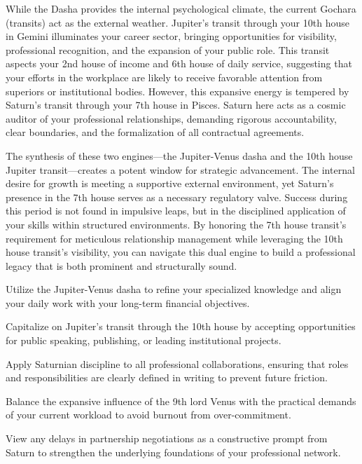 {\fontsize{9}{13}\selectfont While the Dasha provides the internal psychological climate, the current Gochara (transits) act as the external weather. Jupiter's transit through your 10th house in Gemini illuminates your career sector, bringing opportunities for visibility, professional recognition, and the expansion of your public role. This transit aspects your 2nd house of income and 6th house of daily service, suggesting that your efforts in the workplace are likely to receive favorable attention from superiors or institutional bodies. However, this expansive energy is tempered by Saturn's transit through your 7th house in Pisces. Saturn here acts as a cosmic auditor of your professional relationships, demanding rigorous accountability, clear boundaries, and the formalization of all contractual agreements.}\par\vspace{1.8mm}

{\fontsize{9}{13}\selectfont The synthesis of these two engines---the Jupiter-Venus dasha and the 10th house Jupiter transit---creates a potent window for strategic advancement. The internal desire for growth is meeting a supportive external environment, yet Saturn's presence in the 7th house serves as a necessary regulatory valve. Success during this period is not found in impulsive leaps, but in the disciplined application of your skills within structured environments. By honoring the 7th house transit's requirement for meticulous relationship management while leveraging the 10th house transit's visibility, you can navigate this dual engine to build a professional legacy that is both prominent and structurally sound.}\par\vspace{1.8mm}

\begin{diamondlist}
  \item {\fontsize{8.5}{12}\selectfont Utilize the Jupiter-Venus dasha to refine your specialized knowledge and align your daily work with your long-term financial objectives.}
  \item {\fontsize{8.5}{12}\selectfont Capitalize on Jupiter's transit through the 10th house by accepting opportunities for public speaking, publishing, or leading institutional projects.}
  \item {\fontsize{8.5}{12}\selectfont Apply Saturnian discipline to all professional collaborations, ensuring that roles and responsibilities are clearly defined in writing to prevent future friction.}
  \item {\fontsize{8.5}{12}\selectfont Balance the expansive influence of the 9th lord Venus with the practical demands of your current workload to avoid burnout from over-commitment.}
  \item {\fontsize{8.5}{12}\selectfont View any delays in partnership negotiations as a constructive prompt from Saturn to strengthen the underlying foundations of your professional network.}
\end{diamondlist}

